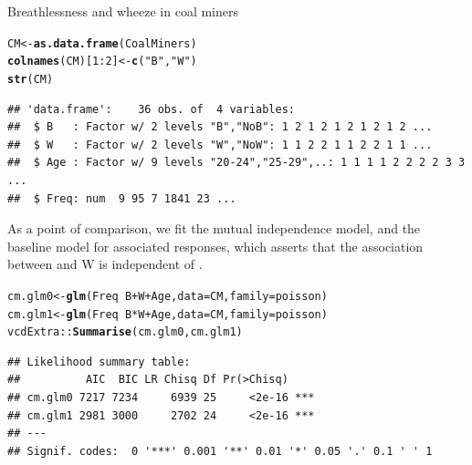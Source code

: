 \documentclass[11pt]{book}\usepackage[]{graphicx}\usepackage[]{color}
\makeatletter
\newcommand{\hlnum}[1]{\textcolor[rgb]{0.686,0.059,0.569}{#1}}%
\newcommand{\hlstr}[1]{\textcolor[rgb]{0.192,0.494,0.8}{#1}}%
\newcommand{\hlopt}[1]{\textcolor[rgb]{0,0,0}{#1}}%
\newcommand{\hlstd}[1]{\textcolor[rgb]{0.345,0.345,0.345}{#1}}%
\newcommand{\hlkwb}[1]{\textcolor[rgb]{0.69,0.353,0.396}{#1}}%
\newcommand{\hlkwc}[1]{\textcolor[rgb]{0.333,0.667,0.333}{#1}}%
\newcommand{\hlkwd}[1]{\textcolor[rgb]{0.737,0.353,0.396}{\textbf{#1}}}%
\newenvironment{kframe}{%
 \def\at@end@of@kframe{}%
 \ifinner\ifhmode%
  \def\at@end@of@kframe{\end{minipage}}%
  \begin{minipage}{\columnwidth}%
 \fi\fi%
 \def\FrameCommand##1{\hskip\@totalleftmargin \hskip-\fboxsep
 \colorbox{shadecolor}{##1}\hskip-\fboxsep
     \hskip-\linewidth \hskip-\@totalleftmargin \hskip\columnwidth}%
 \MakeFramed {\advance\hsize-\width
   \@totalleftmargin\z@ \linewidth\hsize
   \@setminipage}}%
 {\par\unskip\endMakeFramed%
 \at@end@of@kframe}
\newenvironment{knitrout}{}{} %
\renewenvironment{knitrout}{\small\renewcommand{\baselinestretch}{.85}}{} %
\makeatother
\begin{document}
\begin{Example}[coalminers]{Breathlessness and wheeze in coal miners}
\begin{knitrout}
\color{fgcolor}\begin{kframe}
\begin{alltt}
\hlstd{CM} \hlkwb{<-} \hlkwd{as.data.frame}\hlstd{(CoalMiners)}
\hlkwd{colnames}\hlstd{(CM)[}\hlnum{1}\hlopt{:}\hlnum{2}\hlstd{]} \hlkwb{<-} \hlkwd{c}\hlstd{(}\hlstr{"B"}\hlstd{,} \hlstr{"W"}\hlstd{)}
\hlkwd{str}\hlstd{(CM)}
\end{alltt}
\begin{verbatim}
## 'data.frame':	36 obs. of  4 variables:
##  $ B   : Factor w/ 2 levels "B","NoB": 1 2 1 2 1 2 1 2 1 2 ...
##  $ W   : Factor w/ 2 levels "W","NoW": 1 1 2 2 1 1 2 2 1 1 ...
##  $ Age : Factor w/ 9 levels "20-24","25-29",..: 1 1 1 1 2 2 2 2 3 3 ...
##  $ Freq: num  9 95 7 1841 23 ...
\end{verbatim}
\end{kframe}
\end{knitrout}

As a point of comparison, we fit the mutual independence model, 
and the baseline model for associated responses, 
which asserts that the association between  and {W} is
independent of .
\begin{knitrout}
\color{fgcolor}\begin{kframe}
\begin{alltt}
\hlstd{cm.glm0} \hlkwb{<-} \hlkwd{glm}\hlstd{(Freq} \hlopt{~} \hlstd{B} \hlopt{+} \hlstd{W} \hlopt{+} \hlstd{Age,} \hlkwc{data}\hlstd{=CM,} \hlkwc{family}\hlstd{=poisson)}
\hlstd{cm.glm1} \hlkwb{<-} \hlkwd{glm}\hlstd{(Freq} \hlopt{~} \hlstd{B} \hlopt{*} \hlstd{W} \hlopt{+} \hlstd{Age,} \hlkwc{data}\hlstd{=CM,} \hlkwc{family}\hlstd{=poisson)}
\hlstd{vcdExtra::}\hlkwd{Summarise}\hlstd{(cm.glm0, cm.glm1)}
\end{alltt}
\begin{verbatim}
## Likelihood summary table:
##          AIC  BIC LR Chisq Df Pr(>Chisq)    
## cm.glm0 7217 7234     6939 25     <2e-16 ***
## cm.glm1 2981 3000     2702 24     <2e-16 ***
## ---
## Signif. codes:  0 '***' 0.001 '**' 0.01 '*' 0.05 '.' 0.1 ' ' 1
\end{verbatim}
\end{kframe}
\end{knitrout}


\end{Example}
\end{document}
